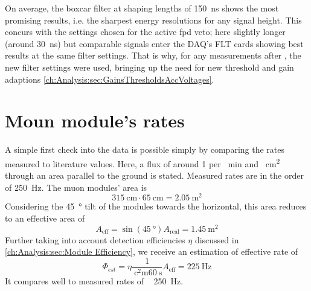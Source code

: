   On average, the boxcar filter at shaping lengths of \SI{150}{\nano\second} shows the most promising results, i.e. the sharpest energy resolutions for any signal height. This concurs with the settings chosen for the active fpd veto; here slightly longer (around \SI{30}{\nano\second}) but comparable signals enter the DAQ's FLT cards showing best results at the same filter settings\cite{KevinWierman}.
  That is why, for any measurements after , the new filter settings were used, bringing up the need for new threshold and gain adaptions \ref{ch:Analysis:sec:GainsThresholdsAccVoltages}. 
  
  \section{Moun module's rates}
  \label{ch:Analysis:sec:Muon module's rates}
  A simple first check into the data is possible simply by comparing the rates measured to literature values. Here, a flux of around 1 per \SI{}{\minute} and \SI{}{\square\centi\meter} through an area parallel to the ground is stated. Measured rates are in the order of \SI{250}{\hertz}. The muon modules' area is
  \begin{equation}
  	\SI{315}{\centi\meter} \cdot \SI{65}{\centi\meter} = \SI{2.05}{\square\meter}
  \end{equation}
  Considering the \SI{45}{\degree} tilt of the modules towards the horizontal, this area reduces to an effective area of 
  \begin{equation}
  	A_{\mathrm{eff}} = \sin{\left(\SI{45}{\degree}\right)} A_{\mathrm{real}} = \SI{1.45}{\square\meter}
  \end{equation}
  Further taking into account detection efficiencies $\eta$ discussed in \ref{ch:Analysis:sec:Module Efficiency}, we receive an estimation of effective rate of
  \begin{equation}
  	\Phi_{est} = \eta \frac{1}{\SI{}{\square\centi\meter}\SI{60}{\second}}A_{\mathrm{eff}} = \SI{225}{\hertz}
  \end{equation}
  It compares well to measured rates of  ~ \SI{250}{\hertz}.
  
